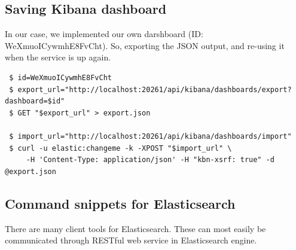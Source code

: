\documentclass[]{article}
\begin{document}
\subsection{Saving Kibana dashboard}\label{saving-kibana-dashboard}

In our case, we implemented our own darshboard (ID:
WeXmuoICywmhE8FvCht). So, exporting the JSON output, and re-using it
when the service is up again.

\begin{verbatim}
 $ id=WeXmuoICywmhE8FvCht
 $ export_url="http://localhost:20261/api/kibana/dashboards/export?dashboard=$id"
 $ GET "$export_url" > export.json

 $ import_url="http://localhost:20261/api/kibana/dashboards/import"
 $ curl -u elastic:changeme -k -XPOST "$import_url" \
     -H 'Content-Type: application/json' -H "kbn-xsrf: true" -d @export.json
\end{verbatim}

\subsection{Command snippets for
Elasticsearch}\label{command-snippets-for-elasticsearch}

There are many client tools for Elasticsearch. These can most easily be
communicated through RESTful web service in Elasticsearch engine.
\end{document}

